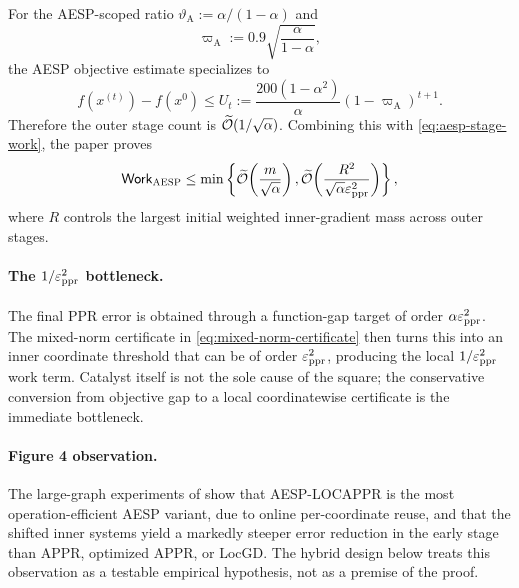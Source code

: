 For the AESP-scoped ratio
\(\vartheta_{\mathrm A}:=\alpha/(1-\alpha)\) and
\begin{equation}
    \varpi_{\mathrm A}:=0.9\sqrt{\frac{\alpha}{1-\alpha}},
    \label{eq:aesp-rho}
\end{equation}
the AESP objective estimate specializes to
\begin{equation}
    f(x^{(t)})-f(x^0)
    \leq
    U_t
    :=\frac{200(1-\alpha^2)}{\alpha}
      (1-\varpi_{\mathrm A})^{t+1}.
    \label{eq:aesp-objective-bound}
\end{equation}
Therefore the outer stage count is
\(\widetilde{\mathcal O}(1/\sqrt\alpha)\).  Combining this with
\cref{eq:aesp-stage-work}, the paper proves
\begin{equation}
    \mathsf{Work}_{\textsc{AESP}}
    \leq
    \min\left\{
       \widetilde{\mathcal O}\!\left(\frac{m}{\sqrt\alpha}\right),
       \widetilde{\mathcal O}\!\left(\frac{R^2}{\sqrt\alpha\varepsilon_{\mathrm{ppr}}^2}\right)
    \right\},
    \label{eq:aesp-current-bound}
\end{equation}
where \(R\) controls the largest initial weighted inner-gradient mass across
outer stages.

\paragraph{The \(1/\varepsilon_{\mathrm{ppr}}^2\) bottleneck.}
The final PPR error is obtained through a function-gap target of order
\(\alpha\varepsilon_{\mathrm{ppr}}^2\).  The mixed-norm certificate in
\cref{eq:mixed-norm-certificate} then turns this into an inner coordinate
threshold that can be of order \(\varepsilon_{\mathrm{ppr}}^2\), producing the local
\(1/\varepsilon_{\mathrm{ppr}}^2\) work term.  Catalyst itself is not the sole cause of the square;
the conservative conversion from objective gap to a local coordinatewise
certificate is the immediate bottleneck.

\paragraph{Figure 4 observation.}
The large-graph experiments of \citet{huang2025accelerated} show that
AESP-LOCAPPR is the most operation-efficient AESP variant, due to online
per-coordinate reuse, and that the shifted inner systems yield a markedly
steeper error reduction in the early stage than APPR, optimized APPR, or
LocGD.  The hybrid design below treats this observation as a testable empirical
hypothesis, not as a premise of the proof.
